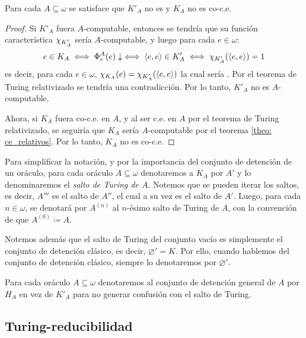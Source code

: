 \begin{agregado}
\begin{coll}
	\label{coll: detencion_relativizados}
	Para cada $A\subseteq\omega$ se satisface que $K'_{A}$ no es  y $K_{A}$ no es co-c.e.
\end{coll}

\begin{proof}
	Si $K'_{A}$ fuera $A$-computable, entonces se tendría que su función característica $\chi_{K'_{A}}$ sería $A$-computable, y luego para cada $e\in\omega$:
	\[
		e\in K_{A}\iff\Phi_{e}^{A}\pa*{e}\ACABA\iff\inner*{e, e}\in K'_{A}\iff\CARACTERISTICA{K'_{A}}\pa*{\inner*{e, e}} = 1
	\]
	es decir, para cada $e\in\omega$, $\CARACTERISTICA{K_{A}}\pa*{e} =\CARACTERISTICA{K'_{A}}\pa*{\inner*{e, e}}$ la cual sería . Por el teorema de Turing relativizado se tendría una contradicción. Por lo tanto, $K'_{A}$ no es $A$-computable.

	Ahora, si $K_{A}$ fuera co-c.e. en $A$, y al ser c.e. en $A$ por el teorema de Turing relativizado, se seguiría que $K_{A}$ sería $A$-computable por el teorema \ref{theo: ce_relativos}. Por lo tanto, $K_{A}$ no es co-c.e.
\end{proof}

\begin{notation}
	Para simplificar la notación, y por la importancia del conjunto de detención de un oráculo, para cada oráculo $A\subseteq\omega$ denotaremos a $K_{A}$ por $A'$ y lo denominaremos el \emph{salto de Turing de $A$}. Notemos que se pueden iterar los saltos, es decir, $A'''$ es el salto de $A''$, el cual a su vez es el salto de $A'$. Luego, para cada $n\in\omega$, se denotará por $A^{(n)}$ al $n$-ésimo salto de Turing de $A$, con la convención de que $A^{(0)}\coloneqq A$.

	Notemos además que el salto de Turing del conjunto vacío es simplemente el conjunto de detención clásico, es decir, $\varnothing' = K$. Por ello, cuando hablemos del conjunto de detención clásico, siempre lo denotaremos por $\varnothing'$.

	Para cada oráculo $A\subseteq\omega$ denotaremos al conjunto de detención general de $A$ por $H_{A}$ en vez de $K'_{A}$ para no generar confusión con el salto de Turing.
\end{notation}
\end{agregado}

\subsection{Turing-reducibilidad}

